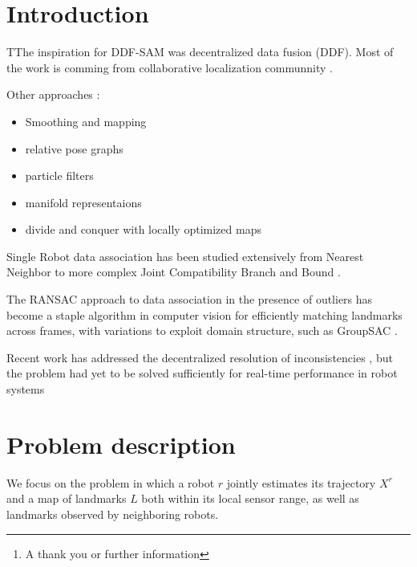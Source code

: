 \documentclass[twoside,twocolumn]{article}
\title{\citetitle{cunningham_fully_2012}} %
\author{%
\textsc{Virgile Daugé}\thanks{A thank you or further information} \\[1ex] %
\normalsize University of Lorraine \\ %
\normalsize \href{mailto:virgile.dauge@inria.fr}{virgile.dauge@inria.fr} %
}
\date{\today} %
\begin{document}
\maketitle


\section{Introduction}

\lettrine[nindent=0em,lines=3]{T}The inspiration for DDF-SAM \cite{cunningham_ddf-sam:_2010} was decentralized data
fusion (DDF). Most of the work is comming from collaborative localization communnity \cite{bailey_decentralised_2011,bahr_consistent_2009}.

Other approaches :
\begin{itemize}
 \item Smoothing and mapping \cite{andersson_c-sam:_2008}
 \item relative pose graphs \cite{kim_multiple_2010}
 \item particle filters \cite{howard_multi-robot_2006,carlone_rao-blackwellized_2010}
 \item manifold representaions \cite{howard_multirobot_2006}
 \item divide and conquer with locally optimized maps \cite{ni_multi-level_2010}
\end{itemize}

Single Robot data association has been studied extensively from
Nearest Neighbor \cite{} to more complex Joint Compatibility Branch
and Bound \cite{neira_data_2001}.

The RANSAC \cite{fischler_random_1981} approach to data association
in the presence of outliers has become a staple algorithm in
computer vision for efficiently matching landmarks across frames, with variations to exploit
domain  structure,  such  as  GroupSAC  \cite{ni_groupsac:_2009}.

Recent  work
has addressed the decentralized resolution of inconsistencies
\cite{aragues_consistent_2011},  but  the  problem  had  yet  to  be  solved  sufficiently  for
real-time performance in robot systems


\section{Problem description}
We  focus  on  the  problem  in  which  a  robot
$r$
jointly
estimates its trajectory
$X^r$
and a map of landmarks
$L$
both
within its local sensor range, as well as landmarks observed
by neighboring robots.
\end{document}
